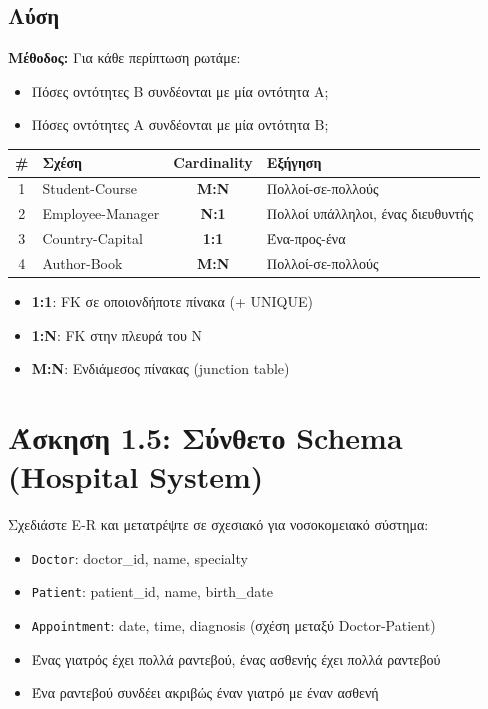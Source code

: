 \subsection*{Λύση}

\textbf{Μέθοδος:} Για κάθε περίπτωση ρωτάμε:
\begin{itemize}
    \item Πόσες οντότητες Β συνδέονται με μία οντότητα Α;
    \item Πόσες οντότητες Α συνδέονται με μία οντότητα Β;
\end{itemize}

\begin{center}
\begin{tabular}{clcl}
\toprule
\textbf{\#} & \textbf{Σχέση} & \textbf{Cardinality} & \textbf{Εξήγηση} \\
\midrule
1 & Student-Course & \textbf{M:N} & Πολλοί-σε-πολλούς \\
2 & Employee-Manager & \textbf{N:1} & Πολλοί υπάλληλοι, ένας διευθυντής \\
3 & Country-Capital & \textbf{1:1} & Ένα-προς-ένα \\
4 & Author-Book & \textbf{M:N} & Πολλοί-σε-πολλούς \\
\bottomrule
\end{tabular}
\end{center}

\begin{infobox}
\begin{itemize}
    \item \textbf{1:1}: FK σε οποιονδήποτε πίνακα (+ UNIQUE)
    \item \textbf{1:N}: FK στην πλευρά του N
    \item \textbf{M:N}: Ενδιάμεσος πίνακας (junction table)
\end{itemize}
\end{infobox}

\section{Άσκηση 1.5: Σύνθετο Schema (Hospital System)}

\begin{formulabox}[Εκφώνηση]
Σχεδιάστε E-R και μετατρέψτε σε σχεσιακό για νοσοκομειακό σύστημα:
\begin{itemize}
    \item \texttt{Doctor}: doctor\_id, name, specialty
    \item \texttt{Patient}: patient\_id, name, birth\_date
    \item \texttt{Appointment}: date, time, diagnosis (σχέση μεταξύ Doctor-Patient)
    \item Ένας γιατρός έχει πολλά ραντεβού, ένας ασθενής έχει πολλά ραντεβού
    \item Ένα ραντεβού συνδέει ακριβώς έναν γιατρό με έναν ασθενή
\end{itemize}
\end{formulabox}

